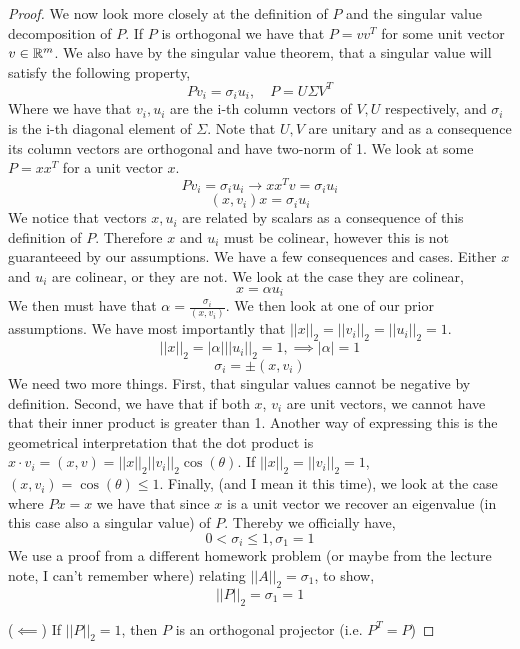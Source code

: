 \documentclass{article}
\begin{document}
\begin{enumerate}
\begin{enumerate}
\begin{proof}
        We now look more closely at the definition of $P$ and the singular value decomposition of $P$. If $P$ is orthogonal we have that $P = vv^T$ for some unit vector $v \in \mathbb{R}^m$. We also have by the singular value theorem, that a singular value will satisfy the following property, 
        \[
            Pv_i = \sigma_iu_i, \quad P = U\Sigma V^T
        \]
        Where we have that $v_i, u_i$ are the i-th column vectors of $V, U$ respectively, and $\sigma_i$ is the i-th diagonal element of $\Sigma$. Note that $U, V$ are unitary and as a consequence its column vectors are orthogonal and have two-norm of 1. We look at some $P = xx^T$ for a unit vector $x$. 
        \[
            Pv_i = \sigma_iu_i \to xx^Tv = \sigma_iu_i
        \]
        \[
            (x, v_i) x = \sigma_i u_i
        \]
        We notice that vectors $x, u_i$ are related by scalars as a consequence of this definition of $P$. Therefore $x$ and $u_i$ must be colinear, however this is not guaranteeed by our assumptions. We have a few consequences and cases. Either $x$ and $u_i$ are colinear, or they are not. We look at the case they are colinear, 
        \[
            x = \alpha u_i
        \]
        We then must have that $\alpha = \frac{\sigma_i}{(x, v_i)}$. We then look at one of our prior assumptions. We have most importantly that $||x||_2 = ||v_i||_2 = ||u_i||_2 = 1$. 
        \[
            ||x||_2 = |\alpha|||u_i||_2 = 1, \implies |\alpha| = 1
        \]
        \[
            \sigma_i = \pm (x, v_i)
        \]
        We need two more things. First, that singular values cannot be negative by definition. Second, we have that if both $x$, $v_i$ are unit vectors, we cannot have that their inner product is greater than 1. Another way of expressing this is the geometrical interpretation that the dot product is $x \cdot v_i = (x, v) = ||x||_2||v_i||_2\cos(\theta)$. If $||x||_2 = ||v_i||_2 = 1$, $(x, v_i) = \cos(\theta) \le 1$. Finally, (and I mean it this time), we look at the case where $Px = x$ we have that since $x$ is a unit vector we recover an eigenvalue (in this case also a singular value) of $P$. Thereby we officially have, 
        \[
            0 < \sigma_i \le 1, \sigma_1 = 1
        \] 
        We use a proof from a different homework problem (or maybe from the lecture note, I can't remember where) relating $||A||_2 = \sigma_1$, to show, 
        \[
            ||P||_2 = \sigma_1 = 1
        \]

        ($\impliedby$) If $||P||_2 = 1$, then $P$ is an orthogonal projector (i.e. $P^T = P$)


\end{proof}
\end{enumerate}
\end{enumerate}
\end{document}
